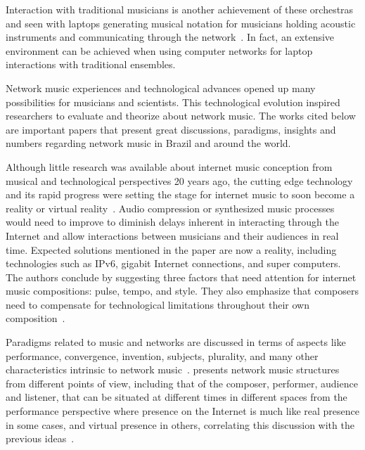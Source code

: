 Interaction with traditional musicians is another achievement of these orchestras and seen with laptops generating musical notation for musicians holding acoustic instruments and communicating through the network~\citep{Lee2013mixed}.
In fact, an extensive environment can be achieved when using computer networks for laptop interactions with traditional ensembles.

Network music experiences and technological advances opened up many possibilities for musicians and scientists.
This technological evolution inspired researchers to evaluate and theorize about network music.
The works cited below are important papers that present great discussions, paradigms, insights and numbers regarding network music in Brazil and around the world.

Although little research was available about internet music conception from musical and technological perspectives 20 years ago, the cutting edge technology and its rapid progress were setting the stage for internet music to soon become a reality or virtual reality~\citep{Kon1998internetmusic}.
Audio compression or synthesized music processes would need to improve to diminish delays inherent in interacting through the Internet and allow interactions between musicians and their audiences in real time.
Expected solutions mentioned in the paper are now a reality, including technologies such as IPv6, gigabit Internet connections, and super computers.
The authors conclude by suggesting three factors that need attention for internet music compositions: pulse, tempo, and style.
They also emphasize that composers need to compensate for technological limitations throughout their own composition~\citep{Kon1998internetmusic}.

Paradigms related to music and networks are discussed in terms of aspects like performance, convergence, invention, subjects, plurality, and many other characteristics intrinsic to network music~\citep{Tanzi2001observations}.
 presents network music structures from different points of view, including that of the composer, performer, audience and listener, that can be situated at different times in different spaces from the performance perspective where presence on the Internet is much like real presence in some cases, and virtual presence in others, correlating this discussion with the previous ideas~\citep{Kon1998internetmusic}.


